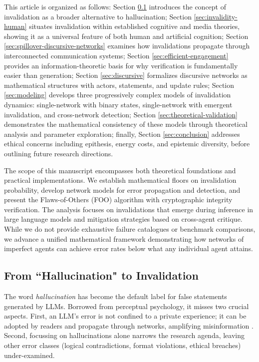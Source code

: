 \documentclass[12pt]{article}
\theoremstyle{definition}
\begin{document}
This article is organized as follows: Section \ref{sec:invalidity-universal} introduces the concept of invalidation as a broader alternative to hallucination; Section \ref{sec:invalidity-human} situates invalidation within established cognitive and media theories, showing it as a universal feature of both human and artificial cognition; Section \ref{sec:spillover-discursive-networks} examines how invalidations propagate through interconnected communication systems; Section \ref{sec:efficient-engagement} provides an information-theoretic basis for why verification is fundamentally easier than generation; Section \ref{sec:discursive} formalizes discursive networks as mathematical structures with actors, statements, and update rules; Section \ref{sec:modeling} develops three progressively complex models of invalidation dynamics: single-network with binary states, single-network with emergent invalidation, and cross-network detection; Section \ref{sec:theoretical-validation} demonstrates the mathematical consistency of these models through theoretical analysis and parameter exploration; finally, Section \ref{sec:conclusion} addresses ethical concerns including epithesis, energy costs, and epistemic diversity, before outlining future research directions.

The scope of this manuscript encompasses both theoretical foundations and practical implementations. We establish mathematical floors on invalidation probability, develop network models for error propagation and detection, and present the Flaws-of-Others (FOO) algorithm with cryptographic integrity verification. The analysis focuses on invalidations that emerge during inference in large language models and mitigation strategies based on cross-agent critique. While we do not provide exhaustive failure catalogues or benchmark comparisons, we advance a unified mathematical framework demonstrating how networks of imperfect agents can achieve error rates below what any individual agent attains.

\subsection{From ``Hallucination" to Invalidation}
\label{sec:invalidity-universal}

The word \emph{hallucination} has become the default label for false
statements generated by LLMs.  Borrowed from perceptual psychology, it
misses two crucial aspects.  First, an LLM's error is not confined to a
private experience; it can be adopted by readers and propagate through
networks, amplifying misinformation \parencite{crawford2021excavating}.
Second, focussing on hallucinations alone narrows the research agenda,
leaving other error classes (logical contradictions, format violations,
ethical breaches) under-examined.
\end{document}
